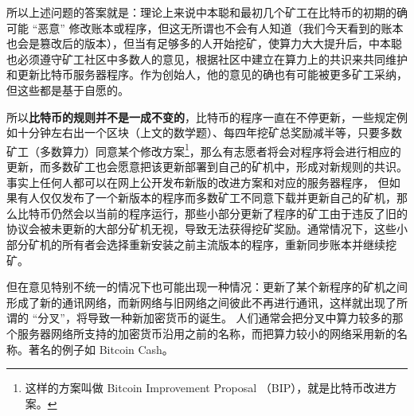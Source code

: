 所以上述问题的答案就是：理论上来说中本聪和最初几个矿工在比特币的初期的确可能 “恶意” 修改账本或程序，但这无所谓也不会有人知道（我们今天看到的账本也会是篡改后的版本），但当有足够多的人开始挖矿，使算力大大提升后，中本聪也必须遵守矿工社区中多数人的意见，根据社区中建立在算力上的共识来共同维护和更新比特币服务器程序。作为创始人，他的意见的确也有可能被更多矿工采纳，但这些都是基于自愿的。

所以\textbf{比特币的规则并不是一成不变的}，比特币的程序一直在不停更新，一些规定例如十分钟左右出一个区块（上文的数学题）、每四年挖矿总奖励减半等，只要多数矿工（多数算力）同意某个修改方案\footnote{这样的方案叫做 Bitcoin Improvement Proposal （BIP），就是比特币改进方案。}，那么有志愿者将会对程序将会进行相应的更新，而多数矿工也会愿意把该更新部署到自己的矿机中，形成对新规则的共识。 事实上任何人都可以在网上公开发布新版的改进方案和对应的服务器程序， 但如果有人仅仅发布了一个新版本的程序而多数矿工不同意下载并更新自己的矿机，那么比特币仍然会以当前的程序运行，那些小部分更新了程序的矿工由于违反了旧的协议会被未更新的大部分矿机无视，导致无法获得挖矿奖励。通常情况下，这些小部分矿机的所有者会选择重新安装之前主流版本的程序，重新同步账本并继续挖矿。

但在意见特别不统一的情况下也可能出现一种情况：更新了某个新程序的矿机之间形成了新的通讯网络，而新网络与旧网络之间彼此不再进行通讯，这样就出现了所谓的 “分叉”，将导致一种新加密货币的诞生。 人们通常会把分叉中算力较多的那个服务器网络所支持的加密货币沿用之前的名称，而把算力较小的网络采用新的名称。著名的例子如 Bitcoin Cash。

